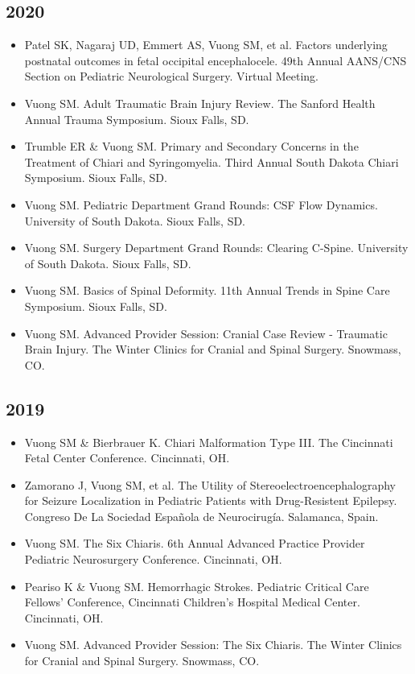 \documentclass[11pt, a4paper]{article}
\begin{document}
\subsection{2020}
\begin{itemize}
  \setlength\itemindent{0.25em}
  \item Patel SK, Nagaraj UD, Emmert AS, Vuong SM, et al. Factors underlying postnatal outcomes in fetal occipital encephalocele. 49th Annual AANS/CNS Section on Pediatric Neurological Surgery. Virtual Meeting.
  \item Vuong SM. Adult Traumatic Brain Injury Review. The Sanford Health Annual Trauma Symposium. Sioux Falls, SD.
  \item Trumble ER \& Vuong SM. Primary and Secondary Concerns in the Treatment of Chiari and Syringomyelia. Third Annual South Dakota Chiari Symposium. Sioux Falls, SD.
  \item Vuong SM. Pediatric Department Grand Rounds: CSF Flow Dynamics. University of South Dakota. Sioux Falls, SD.
  \item Vuong SM. Surgery Department Grand Rounds: Clearing C-Spine. University of South Dakota. Sioux Falls, SD.
  \item Vuong SM. Basics of Spinal Deformity. 11th Annual Trends in Spine Care Symposium. Sioux Falls, SD.
  \item Vuong SM. Advanced Provider Session: Cranial Case Review - Traumatic Brain Injury. The Winter Clinics for Cranial and Spinal Surgery. Snowmass, CO.
\end{itemize}

\subsection{2019}
\begin{itemize}
  \setlength\itemindent{0.25em}
  \item Vuong SM \& Bierbrauer K. Chiari Malformation Type III. The Cincinnati Fetal Center Conference. Cincinnati, OH.
  \item Zamorano J, Vuong SM, et al. The Utility of Stereoelectroencephalography for Seizure Localization in Pediatric Patients with Drug-Resistent Epilepsy. Congreso De La Sociedad Española de Neurocirugía. Salamanca, Spain.
  \item Vuong SM. The Six Chiaris. 6th Annual Advanced Practice Provider Pediatric Neurosurgery Conference. Cincinnati, OH.
  \item Peariso K \& Vuong SM. Hemorrhagic Strokes. Pediatric Critical Care Fellows' Conference, Cincinnati Children's Hospital Medical Center. Cincinnati, OH.
  \item Vuong SM. Advanced Provider Session: The Six Chiaris. The Winter Clinics for Cranial and Spinal Surgery. Snowmass, CO.
\end{itemize}
\end{document}
